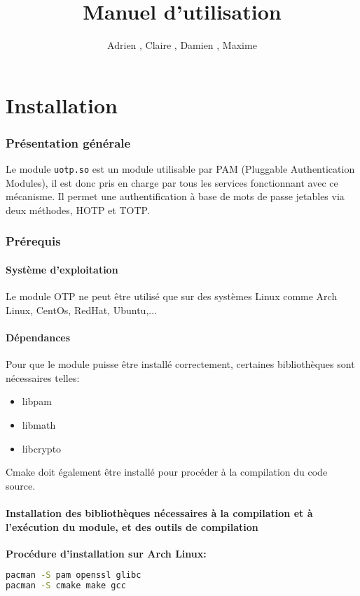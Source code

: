 \documentclass{"../../../res/univ-projet"}
\title{Manuel d'utilisation}
\author{Adrien \bsc{Smondack}, Claire \bsc{Hardouin}, Damien \bsc{Picard}, Maxime \bsc{Michotte}}
\begin{document}
\maketitle
\tableofcontents

\newpage

\part{Installation}
\section{Présentation générale}
Le module \verb?uotp.so? est un module utilisable par PAM (Pluggable Authentication Modules), 
il est donc pris en charge par tous les services fonctionnant avec ce mécanisme. Il permet 
une authentification à base de mots de passe jetables via deux méthodes, HOTP et TOTP.

\label{prereq}
\section{Prérequis}
\subsection{Système d'exploitation}
Le module OTP ne peut être utilisé que sur des systèmes Linux comme Arch Linux, 
CentOs, RedHat, Ubuntu,...

\subsection{Dépendances}
Pour que le module puisse être installé correctement, certaines bibliothèques 
sont nécessaires telles:
\begin{itemize}
\item libpam
\item libmath
\item libcrypto
\end{itemize}
Cmake doit également être installé pour procéder à la compilation du code source.
\newline

\subsection{Installation des bibliothèques nécessaires à la compilation et à l'exécution du module, et des outils de compilation}
\textbf{Procédure d'installation sur Arch Linux:}\\
\begin{lstlisting}[language=bash, backgroundcolor=\color{black}, basicstyle=\color{white}]
pacman -S pam openssl glibc
pacman -S cmake make gcc
\end{lstlisting}
\end{document}

